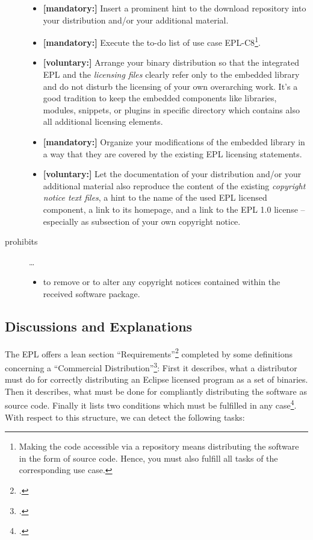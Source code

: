 \begin{description}
\begin{itemize}
  \item \textbf{[mandatory:]} Insert a prominent hint to the download repository
  into your distribution and/or your additional material.
  
  \item \textbf{[mandatory:]} Execute the to-do list of use case EPL-C8\footnote{
  Making the code accessible via a repository means distributing the software in
  the form of source code. Hence, you must also fulfill all tasks of the
  corresponding use case.}.
  
  \item \textbf{[voluntary:]} Arrange your binary distribution so that the
  integrated EPL and the \emph{licensing files} clearly refer only to the
  embedded library and do not disturb the licensing of your own overarching
  work. It's a good tradition to keep the embedded components like libraries,
  modules, snippets, or plugins in specific directory which contains also all
  additional licensing elements.
  
  \item \textbf{[mandatory:]} Organize your modifications of the embedded
  library in a way that they are covered by the existing EPL licensing
  statements. 
  
  \item \textbf{[voluntary:]} Let the documentation of your distribution and/or
  your additional material  also reproduce the content of the existing
  \emph{copyright notice text files}, a hint to the name of the used EPL
  licensed component, a link to its homepage, and a link to the EPL 1.0 license
  -- especially as subsection of your own copyright notice.
  
\end{itemize}

\item[prohibits] \ldots
\begin{itemize}
  \item to remove or to alter any copyright notices contained within the
  received software package.
\end{itemize}

\end{description}

\subsection{Discussions and Explanations}

The EPL offers a lean section
\enquote{Requirements}\footcite[cf.][\nopage wp.\ §3]{Epl10OsiLicense2005a}
completed by some definitions concerning a \enquote{Commercial
Distribution}\footcite[cf.][\nopage wp.\ §4]{Epl10OsiLicense2005a}: First it
describes, what a distributor must do for correctly distributing an Eclipse
licensed program as a set of binaries. Then it describes, what must be done for
compliantly distributing the software as source code. Finally it lists two
conditions which must be fulfilled in any case\footcite[cf.][\nopage wp.\
§3]{Epl10OsiLicense2005a}. With respect to this structure, we can detect the
following tasks:

